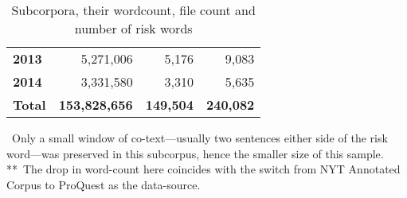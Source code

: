 \begin{table}
\begin{tabular}{p{1.5cm}rrr}
\textbf{2013} & 5,271,006 & 5,176 &  9,083  \\ 
\textbf{2014} & 3,331,580 & 3,310 &  5,635 \\ 
\textbf{Total} & \textbf{153,828,656} & \textbf{149,504} & \textbf{240,082} \\ \bottomrule
\end{tabular}
    \caption{Subcorpora, their wordcount, file count and number of risk words}
    \label{tab:stats}
    \medskip %
\begin{minipage}{0.9\textwidth} %
{\footnotesize *~Only a small window of co-text---usually two sentences either side of the risk word---was preserved in this subcorpus, hence the smaller size of this sample.~\\
 \mbox{*}\mbox{*}~The drop in word-count here coincides with the switch from NYT Annotated Corpus to ProQuest as the data-source.\par}
\end{minipage}
\end{table}


